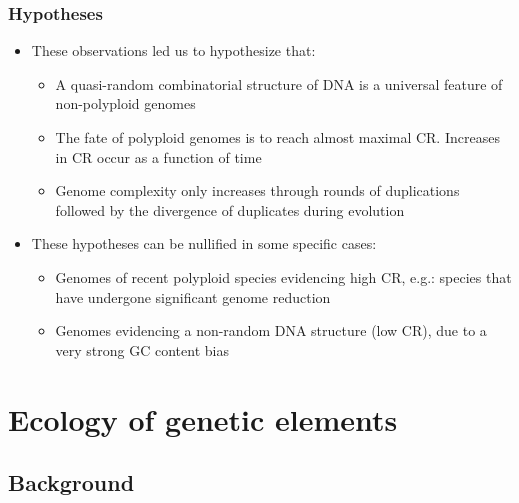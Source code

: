 \documentclass[hyperref={pagebackref=true},table]{beamer}
\begin{document}
\begin{frame}
  \frametitle{Hypotheses}
  \begin{itemize}
  \item<1-> These observations led us to hypothesize that:
    \begin{itemize}
    \item<2-> A quasi-random combinatorial structure of DNA is a universal feature of non-polyploid genomes
    \item<3-> The fate of polyploid genomes is to reach almost maximal CR. Increases in CR occur as a function of time
    \item<4-> Genome complexity only increases through rounds of duplications followed by the divergence of duplicates during evolution
    \end{itemize}
  \item<5-> These hypotheses can be nullified in some specific cases:
    \begin{itemize}
    \item<6-> Genomes of recent polyploid species evidencing high CR, e.g.: species that have undergone significant genome reduction
    \item<7-> Genomes evidencing a non-random DNA structure (low CR), due to a very strong GC content bias
    \end{itemize}
  \end{itemize}
\end{frame}

\section{Ecology of genetic elements}
\subsection{Background}
\end{document}

